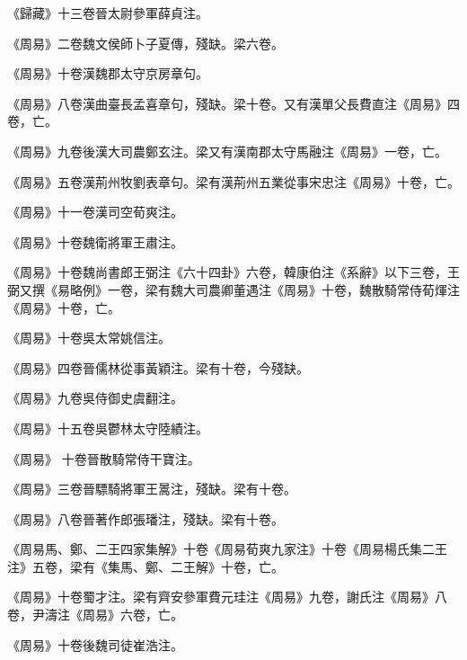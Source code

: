 \begin{pinyinscope}
 《歸藏》十三卷晉太尉參軍薛貞注。



 《周易》二卷魏文侯師卜子夏傳，殘缺。梁六卷。



 《周易》十卷漢魏郡太守京房章句。



 《周易》八卷漢曲臺長孟喜章句，殘缺。梁十卷。又有漢單父長費直注《周易》四卷，亡。



 《周易》九卷後漢大司農鄭玄注。梁又有漢南郡太守馬融注《周易》一卷，亡。



 《周易》五卷漢荊州牧劉表章句。梁有漢荊州五業從事宋忠注《周易》十卷，亡。



 《周易》十一卷漢司空荀爽注。



 《周易》十卷魏衛將軍王肅注。



 《周易》十卷魏尚書郎王弼注《六十四卦》六卷，韓康伯注《系辭》以下三卷，王弼又撰《易略例》一卷，梁有魏大司農卿董遇注《周易》十卷，魏散騎常侍荀煇注《周易》十卷，亡。



 《周易》十卷吳太常姚信注。



 《周易》四卷晉儒林從事黃穎注。梁有十卷，今殘缺。



 《周易》九卷吳侍御史虞翻注。



 《周易》十五卷吳鬱林太守陸績注。



 《周易》
 十卷晉散騎常侍干寶注。



 《周易》三卷晉驃騎將軍王暠注，殘缺。梁有十卷。



 《周易》八卷晉著作郎張璠注，殘缺。梁有十卷。



 《周易馬、鄭、二王四家集解》十卷《周易荀爽九家注》十卷《周易楊氏集二王注》五卷，梁有《集馬、鄭、二王解》十卷，亡。



 《周易》十卷蜀才注。梁有齊安參軍費元珪注《周易》九卷，謝氏注《周易》八卷，尹濤注《周易》六卷，亡。



 《周易》十卷後魏司徒崔浩注。




\end{pinyinscope}
